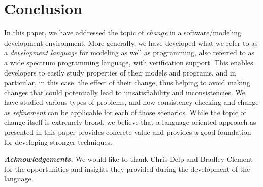 
\section{Conclusion}
\label{sec:conclusion}

In this paper, we have addressed the topic of {\em change} in a
software/modeling development environment. More generally, we
have developed what we refer to as a  {\em development language} 
for modeling as well as programming, also referred to as a 
wide spectrum programming language, with verification support. 
This enables developers to easily study properties of their models and programs, 
and in particular, in this case, the effect of their change, thus helping to
avoid making changes that could potentially lead to unsatisfiability
and inconsistencies. We have studied various types of problems, and how
consistency checking and change as {\em refinement} can be applicable
for each of those scenarios. While the topic of change itself is
extremely broad, we believe that a language oriented approach as
presented in this paper provides concrete value and provides a good
foundation for developing stronger techniques.

\noindent \textbf{\em Acknowledgements.} We would like to thank
Chris Delp and Bradley Clement for the opportunities and insights they
provided during the development of the \Klang{} language.



